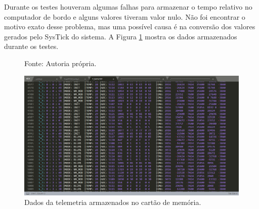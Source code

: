 \newpage
Durante os testes houveram algumas falhas para armazenar o tempo relativo no computador de bordo e alguns valores tiveram valor nulo. Não foi encontrar o motivo exato desse problema, mas uma possível causa é na conversão dos valores gerados pelo SysTick do sistema. A Figura \ref{telemetryData} mostra os dados armazenados durante os testes. 


\begin{figure}[h]
\footnotesize{	
	\centering
\centering
\footnotesize{Fonte: Autoria própria.}

	\includegraphics[keepaspectratio=true,scale=0.48]{figuras/telemetryData.PNG}
	\caption{Dados da telemetria armazenados no cartão de memória.}
	\label{telemetryData}
}
\end{figure}
\FloatBarrier

